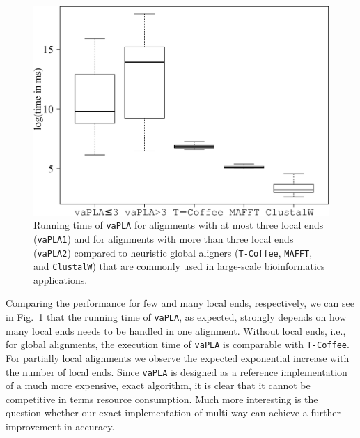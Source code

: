 \documentclass[a4paper,10pt]{article}
\newcommand{\TODO}[1]{\begingroup\color{red}#1\endgroup}
\newcommand{\SAFTWARE}{\texttt{vaPLA}} %
\begin{document}
\begin{figure}
  \begin{center}
    \includegraphics[width=1\columnwidth]{times_combined.eps}
  \end{center}
  \caption{Running time of \SAFTWARE{} for alignments with at most three
    local ends (\texttt{\SAFTWARE{}1}) and for alignments with more than
    three local ends (\texttt{\SAFTWARE{}2}) compared to heuristic global
    aligners (\texttt{T-Coffee}, \texttt{MAFFT}, and \texttt{ClustalW})
    that are commonly used in large-scale bioinformatics applications.}
  \label{fig:manyLoc}
\end{figure}

Comparing the performance for few and many local ends, respectively,
  we can see in Fig.~\ref{fig:manyLoc} that the running time of \SAFTWARE,
as expected, strongly depends on how many local ends needs to be handled in
one alignment. Without local ends, i.e., for global alignments, the
execution time of \SAFTWARE{} is comparable with \texttt{T-Coffee}. For
partially local alignments we observe the expected exponential increase
with the number of local ends. Since \SAFTWARE{} is designed as a reference
implementation of a much more expensive, exact algorithm, it is clear that
it cannot be competitive in terms resource consumption. Much more
interesting is the question whether our exact implementation of multi-way
can achieve a further improvement in accuracy.
\end{document}
